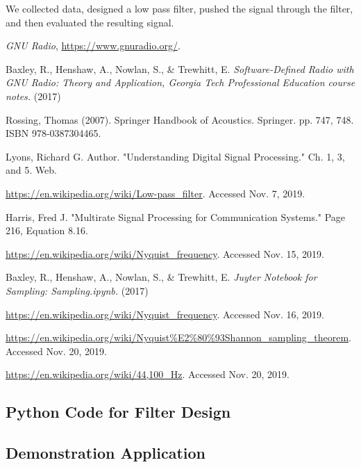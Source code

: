 We collected data, designed a low pass filter, pushed the signal
through the filter, and then evaluated the resulting signal.







\begin{thebibliography}{1}

\emph{GNU Radio}, \url{https://www.gnuradio.org/}.

 Baxley, R., Henshaw, A., Nowlan, S., \&
Trewhitt, E. \emph{Software-Defined Radio with GNU Radio: Theory
and Application, Georgia Tech Professional Education course
notes.} (2017)

 Rossing, Thomas (2007). Springer Handbook of
Acoustics. Springer. pp. 747, 748. ISBN 978-0387304465.

 Lyons, Richard G. Author. "Understanding
Digital Signal Processing." Ch. 1, 3, and 5. Web.

\url{https://en.wikipedia.org/wiki/Low-pass_filter}. Accessed
Nov. 7, 2019.

 Harris, Fred J. "Multirate Signal Processing
for Communication Systems." Page 216, Equation 8.16.

\url{https://en.wikipedia.org/wiki/Nyquist_frequency}. Accessed
Nov. 15, 2019.

 Baxley, R., Henshaw, A., Nowlan, S.,
\& Trewhitt, E. \emph{Juyter Notebook for Sampling:
Sampling.ipynb.} (2017)

\url{https://en.wikipedia.org/wiki/Nyquist_frequency}. Accessed
Nov. 16, 2019.

\url{https://en.wikipedia.org/wiki/Nyquist\%E2\%80\%93Shannon_sampling_theorem}.
Accessed Nov. 20, 2019.

 \url{https://en.wikipedia.org/wiki/44,100_Hz}.
Accessed Nov. 20, 2019.

\end{thebibliography}

\newpage

\onecolumn 
\appendix 

\subsection{Python Code for Filter Design\cite{notes:class}}


\newpage
\subsection{Demonstration Application}





